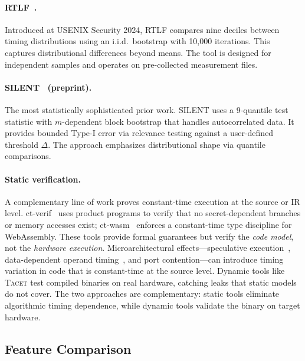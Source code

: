 \documentclass[letterpaper,twocolumn,10pt]{article}
\newcommand{\tacet}{\textsc{Tacet}\xspace}
\newcommand{\rtlf}{\textsc{RTLF}\xspace}
\newcommand{\silent}{\textsc{SILENT}\xspace}
\begin{document}
\paragraph{\rtlf~\cite{rtlf}.}
Introduced at USENIX Security 2024, \rtlf compares nine deciles between timing
distributions using an i.i.d.\ bootstrap with 10,000 iterations. This captures
distributional differences beyond means. The tool is designed for independent
samples and operates on pre-collected measurement files.

\paragraph{\silent~\cite{silent} (preprint).}
The most statistically sophisticated prior work. \silent uses a 9-quantile test
statistic with $m$-dependent block bootstrap that handles autocorrelated data.
It provides bounded Type-I error via relevance testing against a user-defined
threshold $\Delta$. The approach emphasizes distributional shape via quantile
comparisons.

\paragraph{Static verification.}
A complementary line of work proves constant-time execution at the source or
IR level. ct-verif~\cite{ctverif} uses product programs to verify that no
secret-dependent branches or memory accesses exist; ct-wasm~\cite{ctwasm}
enforces a constant-time type discipline for WebAssembly. These tools provide
formal guarantees but verify the \emph{code model}, not the \emph{hardware
execution}. Microarchitectural effects---speculative execution~\cite{spectre},
data-dependent operand timing~\cite{hertzbleed}, and port contention---can
introduce timing variation in code that is constant-time at the source level.
Dynamic tools like \tacet test compiled binaries on real hardware, catching
leaks that static models do not cover. The two approaches are complementary:
static tools eliminate algorithmic timing dependence, while dynamic tools
validate the binary on target hardware.

\subsection{Feature Comparison}
\label{sec:background:comparison}

\end{document}

